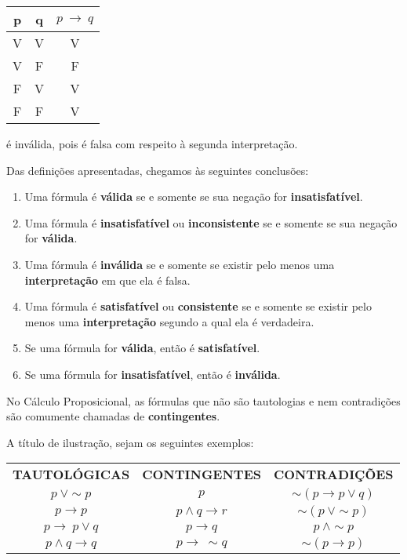 \begin{center}
    \begin{tabular}{c c c}
        p & q & $p\ \to ~q$ \\ \hline
        V & V & V \\
        V & F & F \\
        F & V & V \\
        F & F & V
    \end{tabular}
\end{center}

\noindent é inválida, pois é falsa com respeito à segunda interpretação.

\bigskip
Das definições apresentadas, chegamos às seguintes conclusões:

\begin{enumerate}[label=\textbf{{\arabic*}.}]
    \item Uma fórmula é \textbf{válida} se e somente se sua negação for \textbf{insatisfatível}.
    \item Uma fórmula é \textbf{insatisfatível} ou \textbf{inconsistente} se e somente se sua negação for \textbf{válida}.
    \item Uma fórmula é \textbf{inválida} se e somente se existir pelo menos uma \textbf{interpretação} em que ela é falsa.
    \item Uma fórmula é \textbf{satisfatível} ou \textbf{consistente} se e somente se existir pelo menos uma \textbf{interpretação} segundo a qual ela é verdadeira.
    \item Se uma fórmula for \textbf{válida}, então é \textbf{satisfatível}.
    \item Se uma fórmula for \textbf{insatisfatível}, então é \textbf{inválida}.
\end{enumerate}

No Cálculo Proposicional, as fórmulas que não são tautologias e nem contradições são comumente chamadas de \textbf{contingentes}.

A título de ilustração, sejam os seguintes exemplos:

\begin{center}
    \begin{tabular}{c c c}
        \textbf{TAUTOLÓGICAS} & \textbf{CONTINGENTES} & \textbf{CONTRADIÇÕES}\\
        $p\ \lor \sim p$ & $p$ & $\sim(p \to p \lor q)$\\
        $p \to p$ & $p \land q \to r$ & $\sim(p\ \lor \sim p)$\\
        $p \to\ p \lor q$ & $p \to q$ & $p\ \land \sim p$\\
        $p \land q \to q$ & $p \to\ \sim q$ & $\sim(p \to p)$
    \end{tabular}
\end{center}

